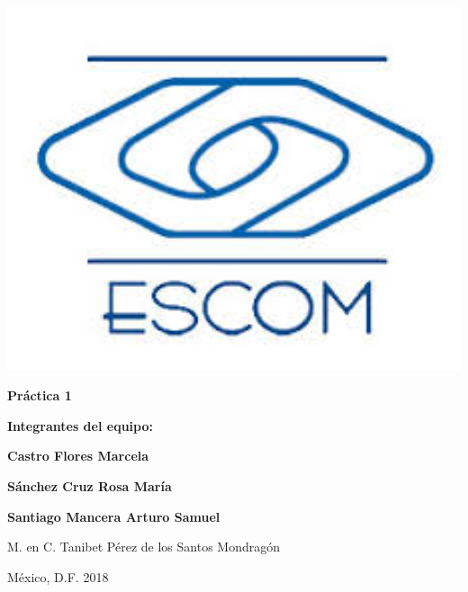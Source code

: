 \begin{minipage}{0.20\textwidth}
\includegraphics[width=1\textwidth]{portada/escom.jpg}

\end{minipage}%

\vspace{3cm}
\centerline{\Large \bf Práctica 1}


\vspace{2cm}
\centerline{\Large  \bf Integrantes del equipo:}
\vspace{1cm}
\centerline{\Large  \bf Castro Flores Marcela}
\vspace{.2cm}
\centerline{\Large  \bf Sánchez Cruz Rosa María}
\vspace{.2cm}
\centerline{\Large  \bf Santiago Mancera Arturo Samuel}

\vspace{2cm}

\centerline{\Large  M. en C. Tanibet Pérez de los Santos Mondragón }
 
\vspace{2cm}
{\large  M\'{e}xico, D.F. \hfill 2018}